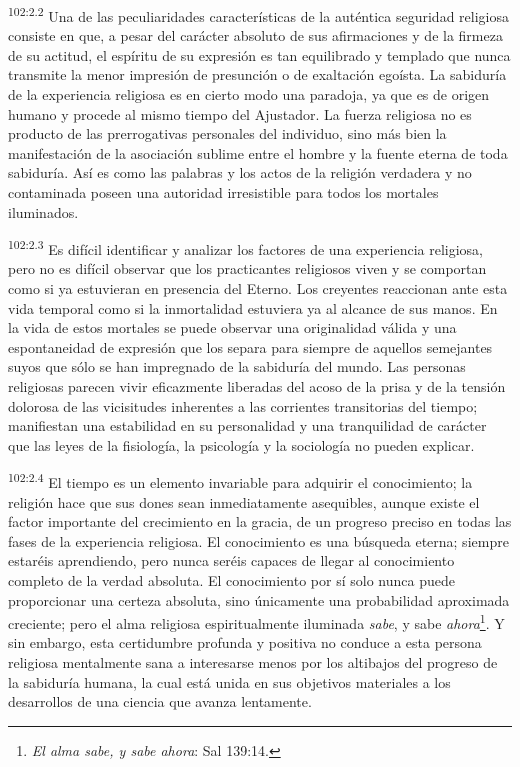 \documentclass[twoside, 11pt]{book}
\begin{document}
\par
\textsuperscript{102:2.2} Una de las peculiaridades características de la auténtica seguridad religiosa consiste en que, a pesar del carácter absoluto de sus afirmaciones y de la firmeza de su actitud, el espíritu de su expresión es tan equilibrado y templado que nunca transmite la menor impresión de presunción o de exaltación egoísta. La sabiduría de la experiencia religiosa es en cierto modo una paradoja, ya que es de origen humano y procede al mismo tiempo del Ajustador. La fuerza religiosa no es producto de las prerrogativas personales del individuo, sino más bien la manifestación de la asociación sublime entre el hombre y la fuente eterna de toda sabiduría. Así es como las palabras y los actos de la religión verdadera y no contaminada poseen una autoridad irresistible para todos los mortales iluminados.

\par
\textsuperscript{102:2.3} Es difícil identificar y analizar los factores de una experiencia religiosa, pero no es difícil observar que los practicantes religiosos viven y se comportan como si ya estuvieran en presencia del Eterno. Los creyentes reaccionan ante esta vida temporal como si la inmortalidad estuviera ya al alcance de sus manos. En la vida de estos mortales se puede observar una originalidad válida y una espontaneidad de expresión que los separa para siempre de aquellos semejantes suyos que sólo se han impregnado de la sabiduría del mundo. Las personas religiosas parecen vivir eficazmente liberadas del acoso de la prisa y de la tensión dolorosa de las vicisitudes inherentes a las corrientes transitorias del tiempo; manifiestan una estabilidad en su personalidad y una tranquilidad de carácter que las leyes de la fisiología, la psicología y la sociología no pueden explicar.

\par
\textsuperscript{102:2.4} El tiempo es un elemento invariable para adquirir el conocimiento; la religión hace que sus dones sean inmediatamente asequibles, aunque existe el factor importante del crecimiento en la gracia, de un progreso preciso en todas las fases de la experiencia religiosa. El conocimiento es una búsqueda eterna; siempre estaréis aprendiendo, pero nunca seréis capaces de llegar al conocimiento completo de la verdad absoluta. El conocimiento por sí solo nunca puede proporcionar una certeza absoluta, sino únicamente una probabilidad aproximada creciente; pero el alma religiosa espiritualmente iluminada \textit{sabe}, y sabe \textit{ahora}\footnote{\textit{El alma sabe, y sabe ahora}: Sal 139:14.}. Y sin embargo, esta certidumbre profunda y positiva no conduce a esta persona religiosa mentalmente sana a interesarse menos por los altibajos del progreso de la sabiduría humana, la cual está unida en sus objetivos materiales a los desarrollos de una ciencia que avanza lentamente.
\end{document}
